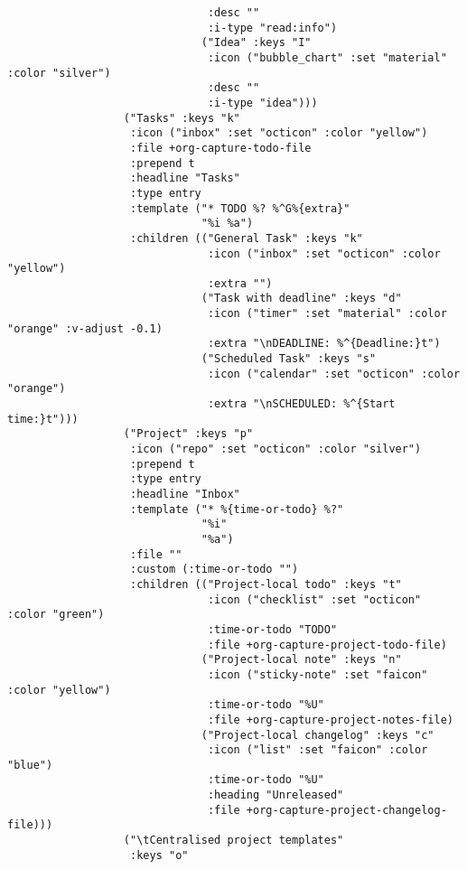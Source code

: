 \documentclass[c]{article}
\theoremstyle{plain}%
\theoremstyle{definition}
\theoremstyle{remark}
\begin{document}
\begin{verbatim}
                               :desc ""
                               :i-type "read:info")
                              ("Idea" :keys "I"
                               :icon ("bubble_chart" :set "material" :color "silver")
                               :desc ""
                               :i-type "idea")))
                  ("Tasks" :keys "k"
                   :icon ("inbox" :set "octicon" :color "yellow")
                   :file +org-capture-todo-file
                   :prepend t
                   :headline "Tasks"
                   :type entry
                   :template ("* TODO %? %^G%{extra}"
                              "%i %a")
                   :children (("General Task" :keys "k"
                               :icon ("inbox" :set "octicon" :color "yellow")
                               :extra "")
                              ("Task with deadline" :keys "d"
                               :icon ("timer" :set "material" :color "orange" :v-adjust -0.1)
                               :extra "\nDEADLINE: %^{Deadline:}t")
                              ("Scheduled Task" :keys "s"
                               :icon ("calendar" :set "octicon" :color "orange")
                               :extra "\nSCHEDULED: %^{Start time:}t")))
                  ("Project" :keys "p"
                   :icon ("repo" :set "octicon" :color "silver")
                   :prepend t
                   :type entry
                   :headline "Inbox"
                   :template ("* %{time-or-todo} %?"
                              "%i"
                              "%a")
                   :file ""
                   :custom (:time-or-todo "")
                   :children (("Project-local todo" :keys "t"
                               :icon ("checklist" :set "octicon" :color "green")
                               :time-or-todo "TODO"
                               :file +org-capture-project-todo-file)
                              ("Project-local note" :keys "n"
                               :icon ("sticky-note" :set "faicon" :color "yellow")
                               :time-or-todo "%U"
                               :file +org-capture-project-notes-file)
                              ("Project-local changelog" :keys "c"
                               :icon ("list" :set "faicon" :color "blue")
                               :time-or-todo "%U"
                               :heading "Unreleased"
                               :file +org-capture-project-changelog-file)))
                  ("\tCentralised project templates"
                   :keys "o"

\end{verbatim}
\end{document}
